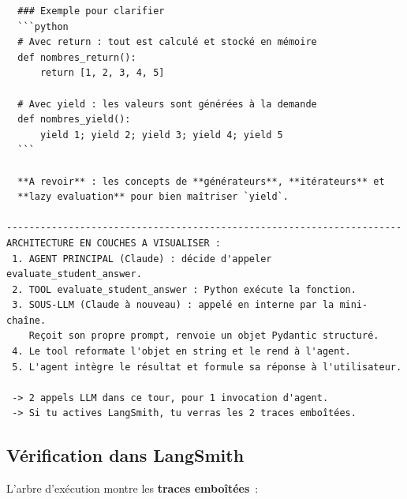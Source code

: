 \documentclass[11pt,a4paper]{article}
\begin{document}
\begin{tcolorbox}[
  colback=white,
  colframe=black!50,
  coltitle=black,
  fonttitle=\footnotesize\bfseries,
  fontupper=\footnotesize,
  title=Sortie de l'exécution,
  breakable,
]
\begin{verbatim}
  ### Exemple pour clarifier
  ```python
  # Avec return : tout est calculé et stocké en mémoire
  def nombres_return():
      return [1, 2, 3, 4, 5]

  # Avec yield : les valeurs sont générées à la demande
  def nombres_yield():
      yield 1; yield 2; yield 3; yield 4; yield 5
  ```

  **A revoir** : les concepts de **générateurs**, **itérateurs** et
  **lazy evaluation** pour bien maîtriser `yield`.

----------------------------------------------------------------------
ARCHITECTURE EN COUCHES A VISUALISER :
 1. AGENT PRINCIPAL (Claude) : décide d'appeler evaluate_student_answer.
 2. TOOL evaluate_student_answer : Python exécute la fonction.
 3. SOUS-LLM (Claude à nouveau) : appelé en interne par la mini-chaîne.
    Reçoit son propre prompt, renvoie un objet Pydantic structuré.
 4. Le tool reformate l'objet en string et le rend à l'agent.
 5. L'agent intègre le résultat et formule sa réponse à l'utilisateur.

 -> 2 appels LLM dans ce tour, pour 1 invocation d'agent.
 -> Si tu actives LangSmith, tu verras les 2 traces emboîtées.
\end{verbatim}
\end{tcolorbox}

\subsection{Vérification dans LangSmith}

L'arbre d'exécution montre les \textbf{traces emboîtées}~:

\begin{center}
\end{center}
\end{document}
